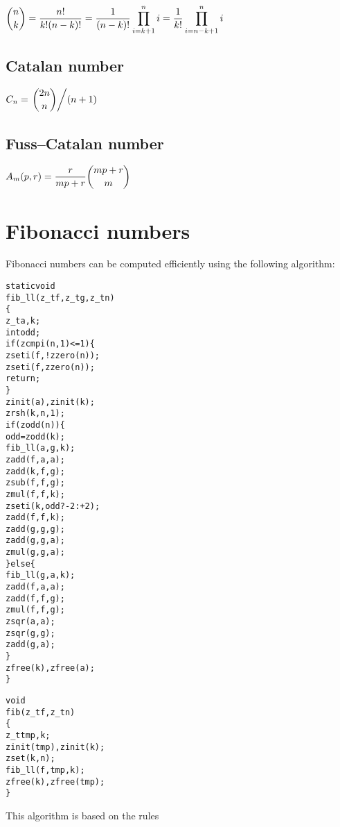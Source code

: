 \( \displaystyle{
    {n \choose k} = {n! \over k!(n - k)!}
    = {1 \over (n - k)!} \prod_{i = k + 1}^n i
    = {1 \over k!} \prod_{i = n - k + 1}^n i
}\)


\subsection{Catalan number}
\label{sec:Catalan number}

\( \displaystyle{
    C_n = \left . {2n \choose n} \middle / (n + 1) \right .
}\)


\subsection{Fuss–Catalan number}
\label{sec:Fuss-Catalan number} %

\( \displaystyle{
    A_m(p, r) = {r \over mp + r} {mp + r \choose m}
}\)


\newpage
\section{Fibonacci numbers}
\label{sec:Fibonacci numbers}

Fibonacci numbers can be computed efficiently
using the following algorithm:

\begin{alltt}
   static void
   fib_ll(z_t f, z_t g, z_t n)
   \{
       z_t a, k;
       int odd;
       if (zcmpi(n, 1) <= 1) \{
           zseti(f, !zzero(n));
           zseti(f, zzero(n));
           return;
       \}
       zinit(a), zinit(k);
       zrsh(k, n, 1);
       if (zodd(n)) \{
           odd = zodd(k);
           fib_ll(a, g, k);
           zadd(f, a, a);
           zadd(k, f, g);
           zsub(f, f, g);
           zmul(f, f, k);
           zseti(k, odd ? -2 : +2);
           zadd(f, f, k);
           zadd(g, g, g);
           zadd(g, g, a);
           zmul(g, g, a);
       \} else \{
           fib_ll(g, a, k);
           zadd(f, a, a);
           zadd(f, f, g);
           zmul(f, f, g);
           zsqr(a, a);
           zsqr(g, g);
           zadd(g, a);
       \}
       zfree(k), zfree(a);
   \}

   void
   fib(z_t f, z_t n)
   \{
       z_t tmp, k;
       zinit(tmp), zinit(k);
       zset(k, n);
       fib_ll(f, tmp, k);
       zfree(k), zfree(tmp);
   \}
\end{alltt}

\noindent
This algorithm is based on the rules

